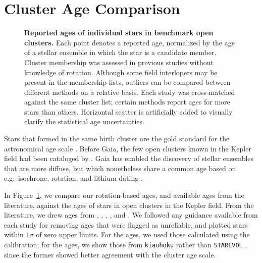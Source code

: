 \documentclass[11pt,twocolumn,tighten]{aastex63}
\begin{document}
\section{Cluster Age Comparison}
\label{sec:litagecomparison}



\begin{figure}[!t]
	\begin{center}
	\end{center}
	\vspace{-0.5cm}
	\caption{
		{\bf Reported ages of individual stars in benchmark open clusters.}
		Each point denotes a reported age,
		normalized by the age of a stellar ensemble in which the star
		is a candidate member.
		Cluster membership was assessed in previous studies without knowledge of rotation.
		Although some field interlopers may be present in the 
		membership lists,
		outliers can be compared between different methods on a
		relative basis.
    Each study was cross-matched against the same cluster list;
    certain methods report ages for more stars than others.
		Horizontal scatter is artificially added to visually
		clarify the statistical age uncertainties.
	}
	\label{fig:agescalecompone}
\end{figure}

Stars that formed in the same birth cluster are the gold standard for
the astronomical age scale \citep{Soderblom_2010}.  Before Gaia, the
few open clusters known in the Kepler field had been
cataloged by \citet{1864RSPT..154....1H}.  Gaia
has enabled the discovery of stellar ensembles
that are more diffuse, but which nonetheless share a common age based
on e.g.~isochrone, rotation, and lithium dating
\cite[e.g.][]{2019AJ....158..122K,Bouma_2022b,Barber_2022}.

In Figure~\ref{fig:agescalecompone}, we compare our rotation-based
ages, and available ages from the literature, against the ages of
stars in open clusters in the Kepler field.  From the
literature, we drew ages from \citet{Reinhold_2015},
\citet{Berger_2020a_catalog}, \citet{2021AJ....161..189L},
\citet{2023ApJ...952..131M}, and \citet{2024AJ....167..159L}.  We
followed any guidance available from each study for
removing ages that were flagged as unreliable, and plotted
stars within $1\sigma$ of zero upper limits.  For the
\citeauthor{Reinhold_2015} ages, we used those calculated
using the \citet{Mamajek_2008} calibration; for the
\citeauthor{2023ApJ...952..131M} ages, we show those from
\texttt{kiauhoku} \citep{Claytor2020} rather than \texttt{STAREVOL}
\citep{Amard2019}, since the former showed better agreement with
the cluster age scale.
\end{document}
